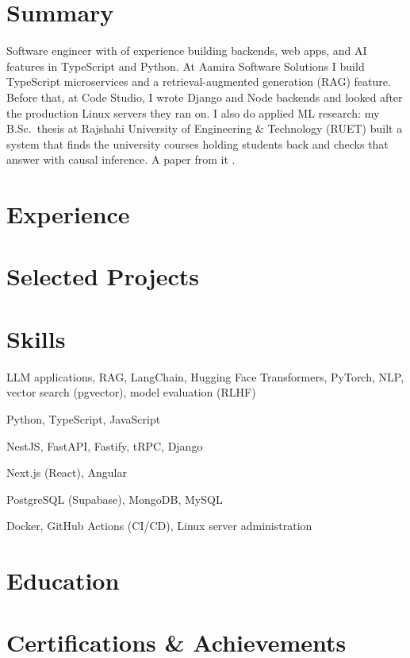 \documentclass[10pt, a4paper]{article}
\begin{document}
\color{primary}
\cvheader

\section{Summary}
Software engineer with \factExpYears{} of experience building backends, web apps, and AI features in TypeScript and Python. At Aamira Software Solutions I build TypeScript microservices and a retrieval-augmented generation (RAG) feature. Before that, at Code Studio, I wrote Django and Node backends and looked after the production Linux servers they ran on. I also do applied ML research: my B.Sc.\ thesis at Rajshahi University of Engineering \& Technology (RUET) built a system that finds the university courses holding students back and checks that answer with causal inference. A paper from it \factLakIs{}.

\section{Experience}





\section{Selected Projects}



\section{Skills}
\begin{description}[style=unboxed, leftmargin=0pt, itemsep=0.2ex]
    \item[AI/ML:] LLM applications, RAG, LangChain, Hugging Face Transformers, PyTorch, NLP, vector search (pgvector), model evaluation (RLHF)
    \item[Languages:] Python, TypeScript, JavaScript
    \item[Backend:] NestJS, FastAPI, Fastify, tRPC, Django
    \item[Frontend:] Next.js (React), Angular
    \item[Databases:] PostgreSQL (Supabase), MongoDB, MySQL
    \item[DevOps:] Docker, GitHub Actions (CI/CD), Linux server administration
\end{description}

\section{Education}
\def\eduthesisline{}


\section{Certifications \& Achievements}
\def\certindustry{}

\end{document}

